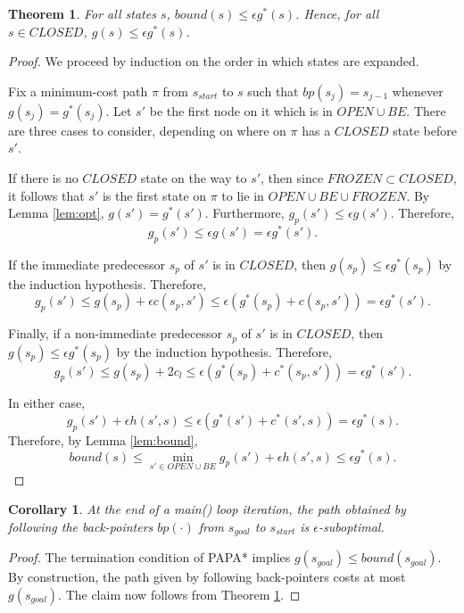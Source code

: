 \documentclass[letterpaper]{article}
\newtheorem{thm}{Theorem}
\newtheorem{cor}{Corollary}
\begin{document}
\begin{thm}
\label{thm:subopt}
For all states $s$, $bound(s) \le \epsilon g^*(s)$. Hence, for all $s\in CLOSED$, $g(s) \le \epsilon g^*(s)$.
\end{thm}

\begin{proof}
We proceed by induction on the order in which states are expanded.

Fix a minimum-cost path $\pi$ from $s_{start}$ to $s$ such that $bp(s_j) = s_{j-1}$ whenever $g(s_j) = g^*(s_j)$. Let $s'$ be the first node on it which is in $OPEN \cup BE$. There are three cases to consider, depending on where on $\pi$ has a $CLOSED$ state before $s'$.

If there is no $CLOSED$ state on the way to $s'$, then since $FROZEN \subset CLOSED$, it follows that $s'$ is the first state on $\pi$ to lie in $OPEN\cup BE\cup FROZEN$. By Lemma \ref{lem:opt}, $g(s') = g^*(s')$. Furthermore, $g_p(s') \le \epsilon g(s')$. Therefore,
\[g_p(s') \le \epsilon g(s') = \epsilon g^*(s').\]

If the immediate predecessor $s_p$ of $s'$ is in $CLOSED$, then $g(s_p) \le \epsilon g^*(s_p)$ by the induction hypothesis. Therefore,
\[g_p(s') \le g(s_p) + \epsilon c(s_p,s') \le \epsilon(g^*(s_p) + c(s_p,s')) = \epsilon g^*(s').\]

Finally, if a non-immediate predecessor $s_p$ of $s'$ is in $CLOSED$, then $g(s_p) \le \epsilon g^*(s_p)$ by the induction hypothesis. Therefore,
\[g_p(s') \le g(s_p) + 2c_l \le \epsilon(g^*(s_p) + c^*(s_p,s')) = \epsilon g^*(s').\]

In either case,
\[g_p(s') + \epsilon h(s',s) \le \epsilon\left(g^*(s') + c^*(s',s)\right) = \epsilon g^*(s).\]
Therefore, by Lemma \ref{lem:bound},
\[bound(s) \le \min_{s' \in OPEN \cup BE} g_p(s') + \epsilon h(s',s) \le \epsilon g^*(s).\]
\end{proof}

\begin{cor}
\label{cor:subopt}
At the end of a main() loop iteration, the path obtained by following the back-pointers $bp(\cdot)$ from $s_{goal}$ to $s_{start}$ is $\epsilon$-suboptimal.
\end{cor}

\begin{proof}
The termination condition of PAPA* implies $g(s_{goal}) \le bound(s_{goal})$. By construction, the path given by following back-pointers costs at most $g(s_{goal})$. The claim now follows from Theorem \ref{thm:subopt}.
\end{proof}
\end{document}
